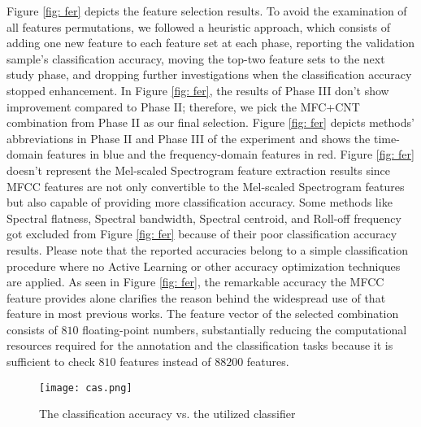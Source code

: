 \documentclass{article}
\begin{document}
Figure \ref{fig: fer} depicts the feature selection results. To avoid the examination of all features permutations, we followed a heuristic approach, which consists of adding one new feature to each feature set at each phase, reporting the validation sample's classification accuracy, moving the top-two feature sets to the next study phase, and dropping further investigations when the classification accuracy stopped enhancement. In Figure \ref{fig: fer}, the results of Phase III don't show improvement compared to Phase II; therefore, we pick the MFC+CNT combination from Phase II as our final selection. Figure \ref{fig: fer} depicts methods' abbreviations in Phase II and Phase III of the experiment and shows the time-domain features in blue and the frequency-domain features in red. Figure \ref{fig: fer} doesn't represent the Mel-scaled Spectrogram feature extraction results since MFCC features are not only convertible to the Mel-scaled Spectrogram features but also capable of providing more classification accuracy. Some methods like Spectral flatness, Spectral bandwidth, Spectral centroid, and Roll-off frequency got excluded from Figure \ref{fig: fer} because of their poor classification accuracy results. Please note that the reported accuracies belong to a simple classification procedure where no Active Learning or other accuracy optimization techniques are applied. As seen in Figure \ref{fig: fer}, the remarkable accuracy the MFCC feature provides alone clarifies the reason behind the widespread use of that feature in most previous works. The feature vector of the selected combination consists of $810$ floating-point numbers, substantially reducing the computational resources required for the annotation and the classification tasks because it is sufficient to check $810$ features instead of $88200$ features. 

\begin{figure}
	\centering	
	\texttt{[image: cas.png]}  		
	\caption{The classification accuracy vs. the utilized classifier}
	\label{fig: cas}
\end{figure}
\end{document}
